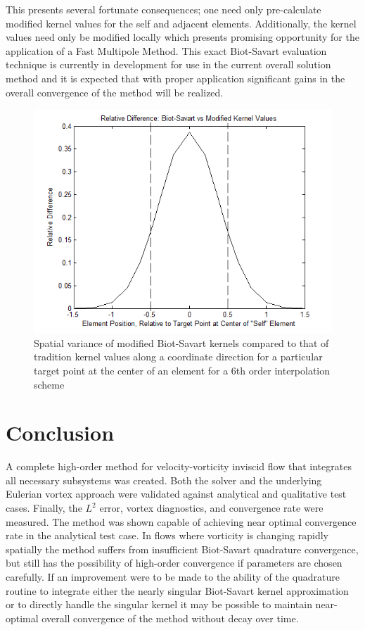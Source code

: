 \documentclass[]{aiaa-tc}%
\begin{document}
This presents several fortunate consequences; one need only pre-calculate modified kernel values for the self and adjacent elements. Additionally, the kernel values need only be modified locally which presents promising opportunity for the application of a Fast Multipole Method. This exact Biot-Savart evaluation technique is currently in development for use in the current overall solution method and it is expected that with proper application significant gains in the overall convergence of the method will be realized.

\begin{figure}
\centering
\includegraphics[width=.6\textwidth]{KernelModComp.PNG}
\caption{\label{fig:KernelModComp}Spatial variance of modified Biot-Savart kernels compared to that of tradition kernel values along a coordinate direction for a particular target point at the center of an element for a 6th order interpolation scheme}
\end{figure}

\section{Conclusion}

A complete high-order method for velocity-vorticity inviscid flow that integrates all necessary subsystems was created. Both the solver and the underlying Eulerian vortex approach were validated against analytical and qualitative test cases. Finally, the $L^2$ error, vortex diagnostics, and convergence rate were measured. The method was shown capable of achieving near optimal convergence rate in the analytical test case. In flows where vorticity is changing rapidly spatially the method suffers from insufficient Biot-Savart quadrature convergence, but still has the possibility of high-order convergence if parameters are chosen carefully. If an improvement were to be made to the ability of the quadrature routine to integrate either the nearly singular Biot-Savart kernel approximation or to directly handle the singular kernel it may be possible to maintain near-optimal overall convergence of the method without decay over time.
\end{document}
